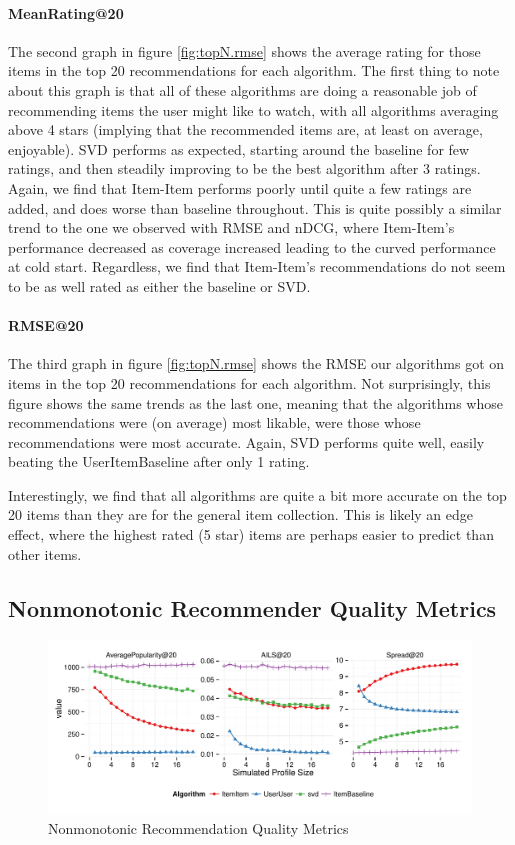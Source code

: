 \documentclass[letterpaper]{sig-alternate}
\begin{document}
  \paragraph{MeanRating@20}
  The second graph in figure \ref{fig:topN.rmse} shows the average rating for those items in the top 20 recommendations for each algorithm.
  The first thing to note about this graph is that all of these algorithms are doing a reasonable job of recommending items the user might like to watch, with all algorithms averaging above 4 stars (implying that the recommended items are, at least on average, enjoyable).
  SVD performs as expected, starting around the baseline for few ratings, and then steadily improving to be the best algorithm after 3 ratings.
  Again, we find that Item-Item performs poorly until quite a few ratings are added, and does worse than baseline throughout.
  This is quite possibly a similar trend to the one we observed with RMSE and nDCG, where Item-Item's performance decreased as coverage increased leading to the curved performance at cold start.
  Regardless, we find that Item-Item's recommendations do not seem to be as well rated as either the baseline or SVD.
    
  \paragraph{RMSE@20}
  The third graph in figure \ref{fig:topN.rmse} shows the RMSE our algorithms got on items in the top 20 recommendations for each algorithm.
  Not surprisingly, this figure shows the same trends as the last one, meaning that the algorithms whose recommendations were (on average) most likable, were those whose recommendations were most accurate.
  Again, SVD performs quite well, easily beating the UserItemBaseline after only 1 rating.
  
  Interestingly, we find that all algorithms are quite a bit more accurate on the top 20 items than they are for the general item collection.
  This is likely an edge effect, where the highest rated (5 star) items are perhaps easier to predict than other items.


\subsection{Nonmonotonic Recommender Quality Metrics}

\begin{figure}[ht!]
  \centering
  \includegraphics[width=\linewidth]{../lenskit/output/ekstrandTuned20/popdiv.pdf}
  \caption{Nonmonotonic Recommendation Quality Metrics}
  \label{fig:pop}
\end{figure}
\end{document}
